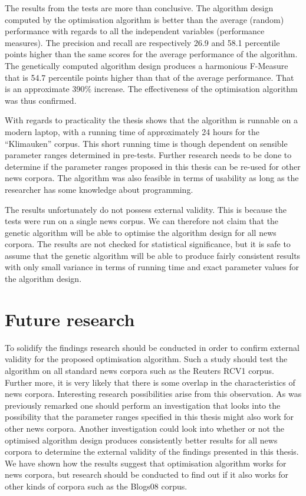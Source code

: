 The results from the tests are more than conclusive. The algorithm design computed by the optimisation algorithm is better than the average (random) performance with regards to all the independent variables (performance measures). The precision and recall are respectively 26.9 and 58.1 percentile points higher than the same scores for the average performance of the algorithm. The genetically computed algorithm design produces a harmonious F-Measure that is 54.7 percentile points higher than that of the average performance. That is an approximate 390\% increase. The effectiveness of the optimisation algorithm was thus confirmed.

With regards to practicality the thesis shows that the algorithm is runnable on a modern laptop, with a running time of approximately 24 hours for the ``Klimauken'' corpus. This short running time is though dependent on sensible parameter ranges determined in pre-tests. Further research needs to be done to determine if the parameter ranges proposed in this thesis can be re-used for other news corpora. The algorithm was also feasible in terms of usability as long as the researcher has some knowledge about programming.

The results unfortunately do not possess external validity. This is because the tests were run on a single news corpus. We can therefore not claim that the genetic algorithm will be able to optimise the algorithm design for all news corpora. The results are not checked for statistical significance, but it is safe to assume that the genetic algorithm will be able to produce fairly consistent results with only small variance in terms of running time and exact parameter values for the algorithm design.

\section{Future research}
To solidify the findings research should be conducted in order to confirm external validity for the proposed optimisation algorithm. Such a study should test the algorithm on all standard news corpora such as the Reuters RCV1 corpus. Further more, it is very likely that there is some overlap in the characteristics of news corpora. Interesting research possibilities arise from this observation. As was previously remarked one should perform an investigation that looks into the possibility that the parameter ranges specified in this thesis might also work for other news corpora. Another investigation could look into whether or not the optimised algorithm design produces consistently better results for all news corpora to determine the external validity of the findings presented in this thesis. We have shown how the results suggest that optimisation algorithm works for news corpora, but research should be conducted to find out if it also works for other kinds of corpora such as the Blogs08 corpus.

